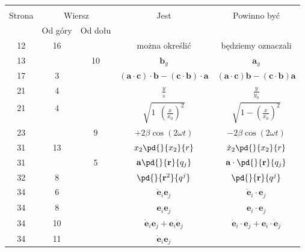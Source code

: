 \documentclass[a4paper,11pt]{article}
\begin{document}
\begin{center}
  \begin{tabular}{|c|c|c|c|c|}
    \hline
    & \multicolumn{2}{c|}{} & & \\
    Strona & \multicolumn{2}{c|}{Wiersz} & Jest
                              & Powinno być \\ \cline{2-3}
    & Od góry & Od dołu & & \\
    \hline
    12  & 16 & & można określić & będziemy oznaczali \\
    13  & & 10 & $\mathbf{ b }_{ y }$ & $\mathbf{ a }_{ y }$ \\
    17  &  3 & & $(\mathbf{ a } \cdot \mathbf{ c } ) \cdot \mathbf{ b }
               - ( \mathbf{ c } \cdot \mathbf{ b } ) \cdot \mathbf{ a }$
           & $(\mathbf{ a } \cdot \mathbf{ c } ) \mathbf{ b }
             - ( \mathbf{ c } \cdot \mathbf{ b } ) \mathbf{ a }$ \\
    21  &  4 & & $\frac{ y }{ { }_{ 0 } }$ & $\frac{ y }{ { y }_{ 0 } }$ \\
    21  &  4 & & $\sqrt{ 1 \:\: \left( \frac{ x }{ x_{ 0 } }
               \right)^{ 2 } } $
           & $\sqrt{ 1 - \left( \frac{ x }{ x_{ 0 } } \right)^{ 2 } } $ \\
    23  & &  9 & $+2\beta \cos( 2\omega t )$ & $-2\beta
                                             \cos( 2\omega t )$ \\
    31  & 13 & & $x_{ 2 } \pd{}{ x_{ 2 } }{ r }$
           & $\dot{ x }_{ 2 } \pd{}{ x_{ 2 } }{ r }$ \\
    31  & &  5 & $\mathbf{ a } \pd{}{ \mathbf{ r } }{ q_{ j } }$
           & $\mathbf{ a } \cdot \pd{}{ \mathbf{ r } }{ q_{ j } }$ \\
    32  &  8 & & $\pd{}{ { \mathbf{ r }^{ 2 } } }{ { q^{ j } } }$
           & $\pd{}{ \mathbf{ r } }{ { q^{ j } } }$ \\
    34  &  6 & & $\dot{ \mathbf{ e } }_{ i } \mathbf{ e }_{ j }$
           & $\dot{ \mathbf{ e } }_{ i } \cdot \mathbf{ e }_{ j }$ \\
    34  &  8 & & $\mathbf{ e }_{ i } \mathbf{ e }_{ j }$
           & $\mathbf{ e }_{ i } \cdot \mathbf{ e }_{ j }$ \\
    34  & 10 & & $\dot{ \mathbf{ e } }_{ i } \mathbf{ e }_{ j }
                + \mathbf{ e }_{ i } \dot{ \mathbf{ e } }_{ j }$
           & $\dot{ \mathbf{ e } }_{ i } \cdot \mathbf{ e }_{ j }
             + \mathbf{ e }_{ i } \cdot \dot{ \mathbf{ e } }_{ j }$ \\
    34  & 11 & & $\dot{ \mathbf{ e } }_{ i } \mathbf{ e }_{ j }$

\end{tabular}
\end{center}
\end{document}
